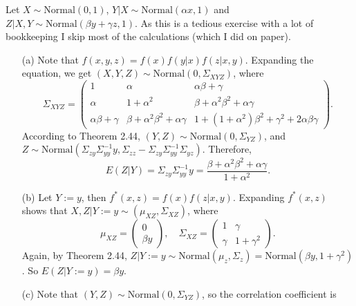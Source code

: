 Let $X \sim \mathrm{Normal}(0, 1)$, $Y|X \sim \mathrm{Normal}(\alpha x, 1)$ and $Z|X,Y \sim \mathrm{Normal}(\beta y + \gamma z, 1)$.
As this is a tedious exercise with a lot of bookkeeping I skip most of the calculations (which I did on paper).
\begin{itemize}
    \item[(a)] Note that $f(x, y, z) = f(x)f(y|x)f(z|x,y)$.
        Expanding the equation, we get $(X, Y, Z) \sim \mathrm{Normal}(0, \Sigma_{XYZ})$, where
        \begin{equation*}
            \Sigma_{XYZ} = \begin{pmatrix}
                1 & \alpha & \alpha \beta + \gamma \\
                \alpha & 1 + \alpha^2 & \beta + \alpha^2 \beta^2 + \alpha \gamma \\
                \alpha \beta + \gamma & \beta + \alpha^2 \beta^2 + \alpha \gamma & 1 + (1 + \alpha^2) \beta^2 + \gamma^2 + 2 \alpha \beta \gamma
            \end{pmatrix}.
        \end{equation*}
        According to Theorem 2.44, $(Y,Z) \sim \mathrm{Normal}(0, \Sigma_{YZ})$, and $Z \sim \mathrm{Normal}(\Sigma_{zy} \Sigma_{yy}^{-1} y, \Sigma_{zz} - \Sigma_{zy} \Sigma_{yy}^{-1} \Sigma_{yz})$.
        Therefore,
        \begin{equation*}
            E(Z|Y) = \Sigma_{zy} \Sigma_{yy}^{-1} y
                = \frac{\beta + \alpha^2 \beta^2 + \alpha \gamma}{1 + \alpha^2}.
        \end{equation*}
    \item[(b)] Let $Y := y$, then $f^*(x, z) = f(x)f(z|x,y)$.
        Expanding $f^*(x,z)$ shows that $X,Z|Y:=y \sim (\mu_{XZ}, \Sigma_{XZ})$, where
        \begin{equation*}
            \mu_{XZ} = \begin{pmatrix}
                0 \\
                \beta y
            \end{pmatrix}, \quad
            \Sigma_{XZ} = \begin{pmatrix}
                1 & \gamma \\
                \gamma & 1 + \gamma^2
            \end{pmatrix}.
        \end{equation*}
        Again, by Theorem 2.44, $Z|Y:=y \sim \mathrm{Normal}(\mu_z, \Sigma_z) = \mathrm{Normal}(\beta y, 1 + \gamma^2)$.
        So $E(Z|Y:=y) = \beta y$.
    \item[(c)] Note that $(Y, Z) \sim \mathrm{Normal}(0, \Sigma_{YZ})$, so the correlation coefficient is

\end{itemize}
